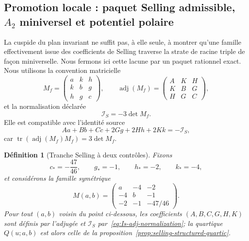 \documentclass[11pt,a4paper]{article}
\newtheorem{definition}[theorem]{Définition}
\begin{document}
\subsection{Promotion locale : paquet Selling admissible, $A_2$ miniversel et potentiel polaire}\label{subsec:selling-A2-polar-promotion}

La cuspide du plan invariant ne suffit pas, à elle seule, à montrer qu'une famille effectivement issue des coefficients de Selling traverse la strate de racine triple de façon miniverselle. Nous fermons ici cette lacune par un paquet rationnel exact. Nous utilisons la convention matricielle
\[
 M_f=\begin{pmatrix}
 a&k&h\\
 k&b&g\\
 h&g&c
 \end{pmatrix},
 \qquad
 \operatorname{adj}(M_f)=
 \begin{pmatrix}
 A&K&H\\
 K&B&G\\
 H&G&C
 \end{pmatrix},
\]
et la normalisation déclarée
\begin{equation}\label{eq:Is-adj-normalization}
 \mathcal I_S=-3\det M_f.
\end{equation}
Elle est compatible avec l'identité source
\[
 Aa+Bb+Cc+2Gg+2Hh+2Kk=-\mathcal I_S,
\]
car $\operatorname{tr}(\operatorname{adj}(M_f)M_f)=3\det M_f$.

\begin{definition}[Tranche Selling à deux contrôles]\label{def:selling-two-control-slice}
Fixons
\[
 c_*=-\frac{47}{46},\qquad g_*=-1,\qquad h_*=-2,\qquad k_*=-4,
\]
et considérons la famille symétrique
\begin{equation}\label{eq:Mab-slice}
 M(a,b)=
 \begin{pmatrix}
 a&-4&-2\\
 -4&b&-1\\
 -2&-1&-47/46
 \end{pmatrix}.
\end{equation}
Pour tout $(a,b)$ voisin du point ci-dessous, les coefficients $(A,B,C,G,H,K)$ sont définis par l'adjugée et $\mathcal I_S$ par~\eqref{eq:Is-adj-normalization}; la quartique $Q(u;a,b)$ est alors celle de la proposition~\ref{prop:selling-structured-quartic}.
\end{definition}
\end{document}
